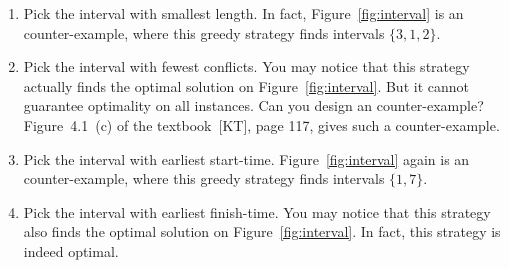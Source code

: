 \begin{enumerate}
\item Pick the interval with smallest length.
In fact, Figure~\ref{fig:interval} is an counter-example, where this greedy strategy finds intervals $\{3, 1, 2\}$.
\item Pick the interval with fewest conflicts.
You may notice that this strategy actually finds the optimal solution on Figure~\ref{fig:interval}.
But it cannot guarantee optimality on all instances. Can you design an counter-example?
Figure~4.1~(c) of the textbook~[KT], page 117, gives such a counter-example.
\item Pick the interval with earliest start-time.
Figure~\ref{fig:interval} again is an counter-example, where this greedy strategy finds intervals $\{1, 7\}$.
\item Pick the interval with earliest finish-time.
You may notice that this strategy also finds the optimal solution on Figure~\ref{fig:interval}.
In fact, this strategy is indeed optimal.
\end{enumerate}

